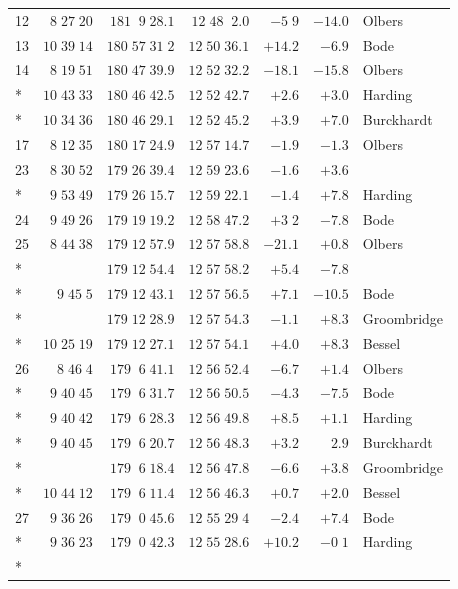 \begin{longtable}{lrrrrrl}
12 & $8\;27\;20$ & $181\;\;9\;28.1$ & $12\;48\;\;2.0$ & $-5\;9$ & $-14.0$ & Olbers \\
13 & $10\;39\;14$ & $180\;57\;31\;2$ & $12\;50\;36.1$ & $+14.2$ & $-6.9$ & Bode \\
14 & $8\;19\;51$ & $180\;47\;39.9$ & $12\;52\;32.2$ & $-18.1$ & $-15.8$ & Olbers \\*
 & $10\;43\;33$ & $180\;46\;42.5$ & $12\;52\;42.7$ & $+2.6$ & $+3.0$ & Harding \\*
 & $10\;34\;36$ & $180\;46\;29.1$ & $12\;52\;45.2$ & $+3.9$ & $+7.0$ & Burckhardt \\
17 & $8\;12\;35$ & $180\;17\;24.9$ & $12\;57\;14.7$ & $-1.9$ & $-1.3$ & Olbers \\
23 & $8\;30\;52$ & $179\;26\;39.4$ & $12\;59\;23.6$ & $-1.6$ & $+3.6$ &  \\*
 & $9\;53\;49$ & $179\;26\;15.7$ & $12\;59\;22.1$ & $-1.4$ & $+7.8$ & Harding \\
24 & $9\;49\;26$ & $179\;19\;19.2$ & $12\;58\;47.2$ & $+3\;2$ & $-7.8$ & Bode \\
25 & $8\;44\;38$ & $179\;12\;57.9$ & $12\;57\;58.8$ & $-21.1$ & $+0.8$ & Olbers \\*
 &  & $179\;12\;54.4$ & $12\;57\;58.2$ & $+5.4$ & $-7.8$ &  \\*
 & $9\;45\;5$ & $179\;12\;43.1$ & $12\;57\;56.5$ & $+7.1$ & $-10.5$ & Bode \\*
 &  & $179\;12\;28.9$ & $12\;57\;54.3$ & $-1.1$ & $+8.3$ & Groombridge \\*
 & $10\;25\;19$ & $179\;12\;27.1$ & $12\;57\;54.1$ & $+4.0$ & $+8.3$ & Bessel \\
26 & $8\;46\;4$ & $179\;\;6\;41.1$ & $12\;56\;52.4$ & $-6.7$ & $+1.4$ & Olbers \\*
 & $9\;40\;45$ & $179\;\;6\;31.7$ & $12\;56\;50.5$ & $-4.3$ & $-7.5$ & Bode \\*
 & $9\;40\;42$ & $179\;\;6\;28.3$ & $12\;56\;49.8$ & $+8.5$ & $+1.1$ & Harding \\*
 & $9\;40\;45$ & $179\;\;6\;20.7$ & $12\;56\;48.3$ & $+3.2$ & $2.9$ & Burckhardt \\*
 &  & $179\;\;6\;18.4$ & $12\;56\;47.8$ & $-6.6$ & $+3.8$ & Groombridge \\*
 & $10\;44\;12$ & $179\;\;6\;11.4$ & $12\;56\;46.3$ & $+0.7$ & $+2.0$ & Bessel \\
27 & $9\;36\;26$ & $179\;\;0\;45.6$ & $12\;55\;29\;4$ & $-2.4$ & $+7.4$ & Bode \\*
 & $9\;36\;23$ & $179\;\;0\;42.3$ & $12\;55\;28.6$ & $+10.2$ & $-0\;1$ & Harding \\*

\end{longtable}
